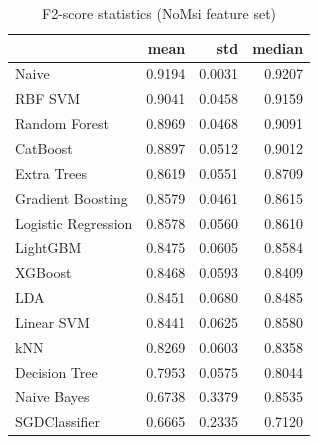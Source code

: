\begin{table}
\caption{F2-score statistics (NoMsi feature set)}
\label{tab:f2_NoMsi_stats}
\begin{tabular}{lrrr}
\toprule
 & mean & std & median \\
\midrule
Naive & 0.9194 & 0.0031 & 0.9207 \\
RBF SVM & 0.9041 & 0.0458 & 0.9159 \\
Random Forest & 0.8969 & 0.0468 & 0.9091 \\
CatBoost & 0.8897 & 0.0512 & 0.9012 \\
Extra Trees & 0.8619 & 0.0551 & 0.8709 \\
Gradient Boosting & 0.8579 & 0.0461 & 0.8615 \\
Logistic Regression & 0.8578 & 0.0560 & 0.8610 \\
LightGBM & 0.8475 & 0.0605 & 0.8584 \\
XGBoost & 0.8468 & 0.0593 & 0.8409 \\
LDA & 0.8451 & 0.0680 & 0.8485 \\
Linear SVM & 0.8441 & 0.0625 & 0.8580 \\
kNN & 0.8269 & 0.0603 & 0.8358 \\
Decision Tree & 0.7953 & 0.0575 & 0.8044 \\
Naive Bayes & 0.6738 & 0.3379 & 0.8535 \\
SGDClassifier & 0.6665 & 0.2335 & 0.7120 \\
\bottomrule
\end{tabular}
\end{table}
